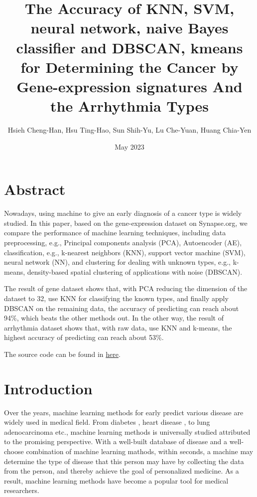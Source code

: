 \documentclass[twocolumn,10pt]{article}
\begin{document}
\title{The Accuracy of KNN, SVM, neural network, naive Bayes classifier and DBSCAN, kmeans for Determining the Cancer by Gene-expression signatures And the Arrhythmia Types}

\author{Hsieh Cheng-Han, Hsu Ting-Hao, Sun Shih-Yu, Lu Che-Yuan, Huang Chia-Yen}
\date{May 2023}
\maketitle

\section*{Abstract}
Nowadays, using machine to give an early diagnosis of a cancer type is widely studied. 
In this paper, based on the gene-expression dataset on Synapse.org, we compare the performance of machine 
learning techniques, including data preprocessing, e.g., Principal components analysis (PCA), Autoencoder 
(AE), classification, e.g., k-nearest neighbors (KNN), support vector machine (SVM), neural network (NN), 
and clustering for dealing with unknown types, e.g., k-means, density-based spatial clustering of 
applications with noise (DBSCAN). 

The result of gene dataset shows that, with PCA reducing the dimension of the dataset to 32, use KNN for 
classifying the known types, and finally apply DBSCAN on the remaining data, the accuracy of predicting 
can reach about 94\%, which beats the other methods out. In the other way, the result of arrhythmia 
dataset shows that, with raw data, use KNN and k-means, the highest accuracy of predicting can reach about 
53\%.

The source code can be found in \href{https://github.com/OEmiliatanO/CSE\_data\_mining}{here}.

\section{Introduction}
\label{sec:Introduction}
Over the years, machine learning methods for early predict various disease are widely used in medical field. 
\cite{kourou2015machine} \cite{cruz2006applications} From diabetes \cite{kavakiotis2017machine}, 
heart disease \cite{learning2017heart}, to lung adenocarcinoma \cite{huang2020machine} etc., machine learning 
methods is universally studied attributed to the promising perspective. With a well-built database of disease 
and a well-choose combination of machine learning mathods, within seconds, a machine may determine the type of 
disease that this person may have by collecting the data from the person, and thereby achieve the goal of 
personalized medicine. As a result, machine learning methods have become a popular tool for medical researchers. 
\end{document}
